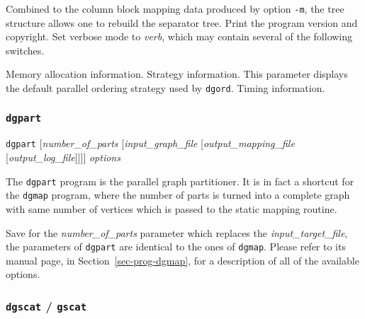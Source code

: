 \begin{itemize}
\begin{itemize}
Combined to the column block mapping data produced by option {\tt -m},
the tree structure allows one to rebuild the separator tree.
\iteme[{\tt -V}]
Print the program version and copyright.
\iteme[{\tt -v}{\it verb}]
Set verbose mode to {\it verb}, which may contain several of the following
switches.
\begin{itemize}
\iteme[{\tt a}]
Memory allocation information.
\iteme[{\tt s}]
Strategy information. This parameter displays the default parallel
ordering strategy used by {\tt dgord}.
\iteme[{\tt t}]
Timing information.
\end{itemize}
\end{itemize}
\end{itemize}

\subsubsection{{\tt dgpart}}

\begin{itemize}
\progsyn
{\tt dgpart} [{\it number\_of\_parts} [{\it input\_\lbt graph\_\lbt file} [{\it output\_\lbt mapping\_\lbt file} [{\it output\_\lbt log\_\lbt file}]]]] {\it options}

\progdes

The {\tt dgpart} program is the parallel graph partitioner. It is
in fact a shortcut for the {\tt dgmap} program, where the number of
parts is turned into a complete graph with same number of vertices
which is passed to the static mapping routine.

Save for the {\it number\_of\_parts} parameter which replaces the {\it
input\_target\_file}, the parameters of {\tt dgpart} are identical to
the ones of {\tt dgmap}. Please refer to its manual page, in
Section~\ref{sec-prog-dgmap}, for a description of all of the
available options.
\end{itemize}

\subsubsection{{\tt dgscat} / {\tt gscat}}

